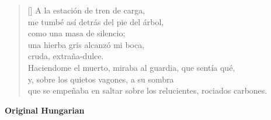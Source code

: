 \documentclass[a4paper,12pt,twoside,final]{book}
\begin{document}

\settowidth{\versewidth}{que se empeñaba en saltar sobre los relucientes, rociados carbones.}

\begin{verse}[\versewidth]
  A la estación de tren de carga, \\
  me tumbé así detrás del pie del árbol, \\
  como una masa de silencio; \\
  una hierba gris alcanzó mi boca, \\
  cruda, extraña-dulce. \\
  Haciendome el muerto, miraba al guardia, que sentía qué, \\
  y, sobre los quietos vagones, a su sombra \\
  que se empeñaba en saltar sobre los relucientes, rociados carbones. \\
\end{verse}

\newpage


\noindent \textbf{Original Hungarian}



\settowidth{\versewidth}{Csak ami nincs, annak van bokra,}
\end{document}

